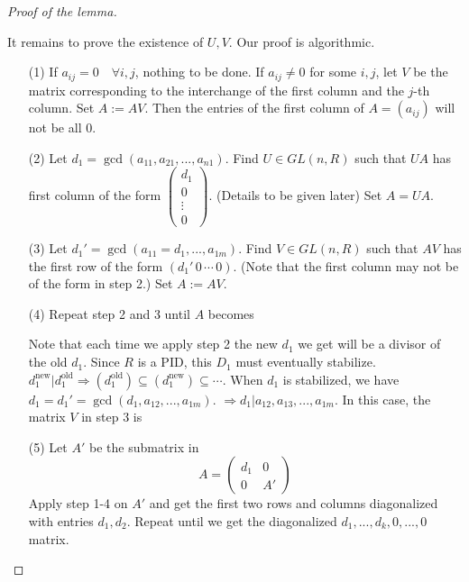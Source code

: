 \documentclass{article}
\theoremstyle{definition}
\newenvironment{proofs}[1][\proofname]{%
  \begin{proof}[#1]$ $\par\nobreak\ignorespaces
}{%
  \end{proof}
}
\newcommand{\Ra}{\Rightarrow}
\begin{document}
\begin{proofs}[Proof of the lemma]
	It remains to prove the existence of $U, V$.
	Our proof is algorithmic.
	\begin{enumerate}
		\item[(1)] If $a_{ij} = 0 \quad \forall i, j$, nothing to be done.
			If $a_{ij} \neq 0$ for some $i, j$, let $V$ be the matrix corresponding to the interchange of the first column and the $j$-th column.
			Set $A := AV$.
			Then the entries of the first column of $A = (a_{ij})$ will not be all 0.

		\item[(2)] Let $d_1 = \gcd (a_{11}, a_{21}, ..., a_{n1})$. 
			Find $U \in GL(n, R)$ such that $UA$ has first column of the form $\left(\begin{smallmatrix}
				d_1\\
				0\\
				\vdots\\
				0
			\end{smallmatrix}\right)$. 
			(Details to be given later)
			Set $A = UA$.

		\item[(3)] Let $d_1' = \gcd(a_{11} = d_1, ..., a_{1m})$.
			Find $V \in GL(n, R)$ such that $AV$ has the first row of the form $(d_1' \, 0 \, \cdots \, 0)$.
			(Note that the first column may not be of the form in step 2.)
			Set $A := AV$.

		\item[(4)] Repeat step 2 and 3 until $A$ becomes\\

			\par Note that each time we apply step 2 the new $d_1$ we get will be a divisor of the old $d_1$.
			Since $R$ is a PID, this $D_1$ must eventually stabilize.
			$d_1^{\text{new}} | d_1^{\text{old}} \Ra (d_1^{\text{old}}) \subseteq (d_1^{\text{new}}) \subseteq \cdots$.
			When $d_1$ is stabilized, we have $d_1 = d_1' = \gcd(d_1, a_{12}, ..., a_{1m})$.
			$\Ra d_1 | a_{12}, a_{13}, ..., a_{1m}$.
			In this case, the matrix $V$ in step 3 is \\

		\item[(5)] Let $A'$ be the submatrix in 
			\[
				A = 
				\begin{pmatrix}
					d_1 & 0\\
					0 & A'
				\end{pmatrix}
			\]
			Apply step 1-4 on $A'$ and get the first two rows and columns diagonalized with entries $d_1, d_2$.
			Repeat until we get the diagonalized $d_1, ..., d_k, 0, ..., 0$ matrix.


\end{enumerate}
\end{proofs}
\end{document}
